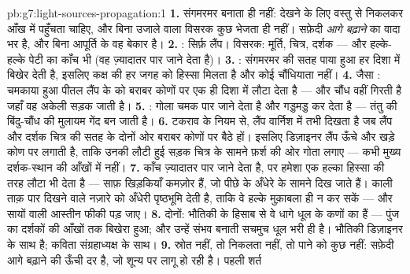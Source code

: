 \begin{solution}{pb:g7:light-sources-propagation:1}
\textbf{1.} संगमरमर  बनाता ही नहीं: देखने के लिए वस्तु से निकलकर
आँख में पहुँचता  चाहिए, और बिना उजाले वाला विसरक कुछ भेजता ही
नहीं। सफ़ेदी \emph{आगे बढ़ाने} का वादा भर है, और बिना आपूर्ति के वह
बेकार है।
\textbf{2.} : सिर्फ़ लैंप। विसरक: मूर्ति, चित्र, दर्शक
--- और हल्के-हल्के पेटी का काँच भी (वह ज़्यादातर पार जाने देता है)।
\textbf{3.} : संगमरमर की सतह पाया हुआ  हर दिशा में बिखेर
देती है, इसलिए कक्ष की हर जगह को हिस्सा मिलता है और कोई चौंधियाता
नहीं।
\textbf{4.}  जैसा : चमकाया हुआ पीतल लैंप के  को
बराबर कोणों पर एक ही दिशा में लौटा देता है --- और चौंध वहीं गिरती है
जहाँ वह अकेली सड़क जाती है।
\textbf{5.} : गोला चमक पार जाने देता है और  गड्डमड्ड
कर देता है --- तंतु की बिंदु-चौंध  की मुलायम गेंद बन जाती है।
\textbf{6.} टकराव के नियम से, लैंप वार्निश में तभी दिखता है जब लैंप
और दर्शक चित्र की सतह के दोनों ओर बराबर कोणों पर बैठे हों। इसलिए
डिज़ाइनर लैंप ऊँचे और खड़े कोण पर लगाती है, ताकि उनकी लौटी हुई सड़क
चित्र के सामने फ़र्श की ओर गोता लगाए --- कभी मुख्य दर्शक-स्थान की
आँखों में नहीं।
\textbf{7.} काँच ज़्यादातर पार जाने देता है, पर हमेशा एक हल्का हिस्सा
 की तरह लौटा भी देता है --- साफ़ खिड़कियाँ कमज़ोर  हैं,
जो पीछे के अँधेरे के सामने दिख जाते हैं। काली ताक़ पार दिखने वाले
नज़ारे को अँधेरी पृष्ठभूमि देती है, ताकि वे हल्के  मुक़ाबला
ही न कर सकें --- और सायों वाली आस्तीन फीकी पड़ जाए।
\textbf{8.} दोनों: भौतिकी के हिसाब से वे धागे धूल के कणों का  हैं
--- पुंज का  दर्शकों की आँखों तक बिखेरा हुआ; और उन्हें संभव
बनाती सचमुच धूल भरी  ही है। भौतिकी डिज़ाइनर के साथ है; कविता
संग्रहाध्यक्ष के साथ।
\textbf{9.} स्रोत नहीं, तो निकलता  नहीं, तो पाने को कुछ नहीं:
सफ़ेदी आगे बढ़ाने की ऊँची दर है, जो शून्य पर लागू हो रही है। पहली शर्त

\end{solution}
